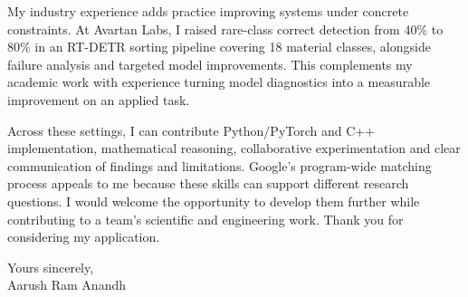 \documentclass[11pt,a4paper]{article}
\begin{document}
My industry experience adds practice improving systems under concrete constraints. At Avartan Labs, I raised rare-class correct detection from 40\% to 80\% in an RT-DETR sorting pipeline covering 18 material classes, alongside failure analysis and targeted model improvements. This complements my academic work with experience turning model diagnostics into a measurable improvement on an applied task.\par\vspace{10pt}
Across these settings, I can contribute Python/PyTorch and C++ implementation, mathematical reasoning, collaborative experimentation and clear communication of findings and limitations. Google's program-wide matching process appeals to me because these skills can support different research questions. I would welcome the opportunity to develop them further while contributing to a team's scientific and engineering work. Thank you for considering my application.\par\vspace{14pt}
Yours sincerely,\\[5pt]
Aarush Ram Anandh
\end{document}
